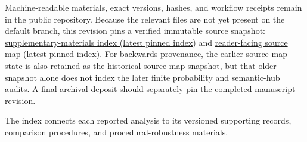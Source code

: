 \documentclass[11pt]{article}
\begin{document}
Machine-readable materials, exact versions, hashes, and workflow receipts remain in the public repository. Because the relevant files are not yet present on the default branch, this revision pins a verified immutable source snapshot: \href{https://github.com/rinsakamo/relay-theory/blob/4e1b5141baf64ba7283011aca0681e5c730e0f74/paper/venues/jgps/supplementary-materials-index.md}{supplementary-materials index (latest pinned index)} and \href{https://github.com/rinsakamo/relay-theory/blob/4e1b5141baf64ba7283011aca0681e5c730e0f74/paper/venues/jgps/reader-facing-source-map.json}{reader-facing source map (latest pinned index)}. For backwards provenance, the earlier source-map state is also retained as \href{https://github.com/rinsakamo/relay-theory/blob/dd043ce1312d658fdd3d47a8875114b59c19e096/paper/venues/jgps/reader-facing-source-map.json}{the historical source-map snapshot}, but that older snapshot alone does not index the later finite probability and semantic-hub audits. A final archival deposit should separately pin the completed manuscript revision.

The index connects each reported analysis to its versioned supporting records, comparison procedures, and procedural-robustness materials.
\end{document}
